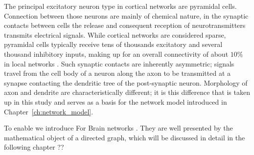 The principal excitatory neuron type in cortical
networks are pyramidal cells. Connection between those neurons are mainly of chemical
nature, in the synaptic contacts between cells the release and
consequent reception of neurotransmitters transmits electrical
signals. While cortical networks are considered sparse, pyramidal
cells typically receive tens of thousands excitatory and several
thousand inhibitory inputs, making up for an overall connectivity of
about $10\%$ in local networks \parencite{Spruston2009}. Such synaptic
contacts are inherently asymmetric; signals travel from the cell body
of a neuron along the axon to be transmitted at a synapse contacting
the dendritic tree of the post-synaptic neuron. Morphology of axon and
dendrite are characteristically different; it is this difference that
is taken up in this study and serves as a basis for the network model introduced in Chapter~\ref{ch:network_model}.

To enable we introduce 
For Brain networks . They are well presented by the mathematical
object of a directed graph, which will be discussed in detail in the
following chapter ??









